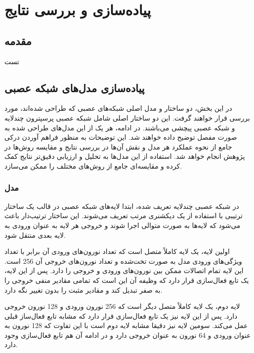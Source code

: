 \chapter{پیاده‌سازی و بررسی نتایج}

\section{مقدمه}
تست



\section{پیاده‌سازی مدل‌های شبکه عصبی}
در این بخش، دو ساختار و مدل اصلی شبکه‌های عصبی که طراحی شده‌اند، مورد بررسی قرار خواهند گرفت. این دو ساختار اصلی شامل شبکه عصبی پرسپترون چندلایه%
و شبکه عصبی پیچشی%
می‌باشند. در ادامه، هر یک از این مدل‌های طراحی شده به صورت مفصل توضیح داده خواهند شد. این توضیحات به منظور فراهم آوردن درکی جامع از نحوه عملکرد هر مدل و نقش آن‌ها در بررسی نتایج و مقایسه روش‌ها در پژوهش انجام خواهد شد. استفاده از این مدل‌ها به تحلیل و ارزیابی دقیق‌تر نتایج کمک کرده و مقایسه‌ای جامع از روش‌های مختلف را ممکن می‌سازد.

\subsection{
	مدل
}
در شبکه عصبی چندلایه تعریف شده، ابتدا لایه‌های شبکه عصبی در قالب یک ساختار ترتیبی%
با استفاده از یک دیکشنری مرتب%
تعریف می‌شوند. این ساختار ترتیب‌دار باعث می‌شود که لایه‌ها به صورت متوالی اجرا شوند و خروجی هر لایه به عنوان ورودی به لایه بعدی منتقل شود.

اولین لایه، یک لایه کاملاً متصل است که تعداد نورون‌های ورودی آن برابر با تعداد ویژگی‌های ورودی مدل به صورت تخت‌شده%
و تعداد نورون‌های خروجی آن 256 است. این لایه تمام اتصالات ممکن بین نورون‌های ورودی و خروجی را دارد. پس از این لایه، یک تابع فعال‌سازی 
قرار دارد که وظیفه آن این است که تمامی مقادیر منفی خروجی را به صفر تبدیل کند و مقادیر مثبت را بدون تغییر نگه دارد.

لایه دوم، یک لایه کاملاً متصل دیگر است که 256 نورون ورودی و 128 نورون خروجی دارد. پس از این لایه نیز یک تابع فعال‌سازی
قرار دارد که مشابه تابع فعال‌ساز قبلی عمل می‌کند. سومین لایه نیز دقیقا مشابه لایه دوم است با این تفاوت که 128 نورون به عنوان ورودی و 64 نورون به عنوان خروجی دارد و در ادامه آن هم تابع فعال‌سازی
وجود دارد.

